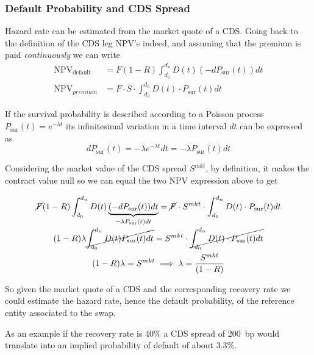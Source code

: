 \subsubsection*{Default Probability and CDS Spread}

Hazard rate can be estimated from the market quote of a CDS. Going back to the definition of the CDS leg NPV's indeed, and assuming that the premium is paid \emph{continuously} we can write
\begin{equation}
  \begin{aligned}
    \mathrm{NPV_{default}} &= F(1-R) \int_{d_0}^{d_n} D(t) (-dP_{\textrm{sur}}(t)) dt \\
    \textrm{NPV}_{premium} &= F\cdot S \cdot \int_{d_0}^{d_n} D(t) \cdot P_{\textrm{sur}}(t) dt 
  \end{aligned}
\end{equation}

If the survival probability is described according to a Poisson process $P_{\textrm{sur}}(t) = e^{-\lambda t}$ its infinitesimal variation in a time interval $dt$ can be expressed as
\begin{equation*}
  dP_{\textrm{sur}}(t) = -\lambda e^{-\lambda t} dt = -\lambda P_{\textrm{sur}}(t) dt 
\end{equation*}

Considering the market value of the CDS spread $S^{mkt}$, by definition, it makes the contract value null so we can equal the two NPV expression above to get

\begin{equation*}
  \begin{gathered}
    \cancel{F}(1-R) \int_{d_0}^{d_n} D(t) \underbrace{(-dP_{\textrm{sur}}(t)) dt}_{-\lambda  P_{\textrm{sur}}(t) dt} =  \cancel{F}\cdot S^{mkt} \cdot \int_{d_0}^{d_n} D(t) \cdot P_{\textrm{sur}}(t) dt \\
    (1-R) \lambda \cancel{\int_{d_0}^{d_n} D(t) P_{\textrm{sur}}(t) dt} =  S^{mkt} \cdot \cancel{\int_{d_0}^{d_n} D(t) \cdot P_{\textrm{sur}}(t) dt} \\
    (1-R) \lambda = S^{mkt} \implies  \lambda = \frac{ S^{mkt}}{(1-R)}
  \end{gathered}
\end{equation*}

So given the market quote of a CDS and the corresponding recovery rate we could estimate the hazard rate, hence the default probability, of the reference entity associated to the swap.

As an example if the recovery rate is 40\% a CDS spread of 200~bp would translate into an implied probability of default of about 3.3\%.

